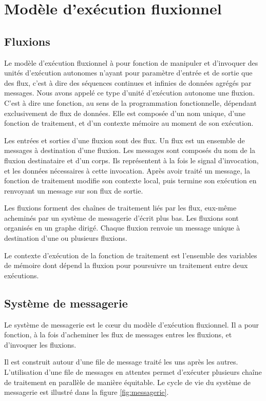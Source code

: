 \section{Modèle d'exécution fluxionnel}

\subsection{Fluxions}

Le modèle d'exécution fluxionnel à pour fonction de manipuler et d'invoquer des unités d'exécution autonomes n'ayant pour paramètre d'entrée et de sortie que des flux, c'est à dire des séquences continues et infinies de données agrégés par messages.
Nous avons appelé ce type d'unité d'exécution autonome une fluxion.
C'est à dire une fonction, au sens de la programmation fonctionnelle, dépendant exclusivement de flux de données.
Elle est composée d'un nom unique, d'une fonction de traitement, et d'un contexte mémoire au moment de son exécution.

Les entrées et sorties d'une fluxion sont des flux.
Un flux est un ensemble de messages à destination d'une fluxion.
Les messages sont composés du nom de la fluxion destinataire et d'un corps.
Ils représentent à la fois le signal d'invocation, et les données nécessaires à cette invocation.
Après avoir traité un message, la fonction de traitement modifie son contexte local, puis termine son exécution en renvoyant un message sur son flux de sortie.

Les fluxions forment des chaînes de traitement liés par les flux, eux-même acheminés par un système de messagerie d'écrit plus bas.
Les fluxions sont organisés en un graphe dirigé.
Chaque fluxion renvoie un message unique à destination d'une ou plusieurs fluxions.

Le contexte d'exécution de la fonction de traitement est l'ensemble des variables de mémoire dont dépend la fluxion pour poursuivre un traitement entre deux exécutions.

\subsection{Système de messagerie}

Le système de messagerie est le cœur du modèle d'exécution fluxionnel.
Il a pour fonction, à la fois d'acheminer les flux de messages entres les fluxions, et d'invoquer les fluxions.

Il est construit autour d'une file de message traité les uns après les autres.
L'utilisation d'une file de messages en attentes permet d'exécuter plusieurs chaîne de traitement en parallèle de manière équitable.
Le cycle de vie du système de messagerie est illustré dans la figure \ref{fig:messagerie}.


